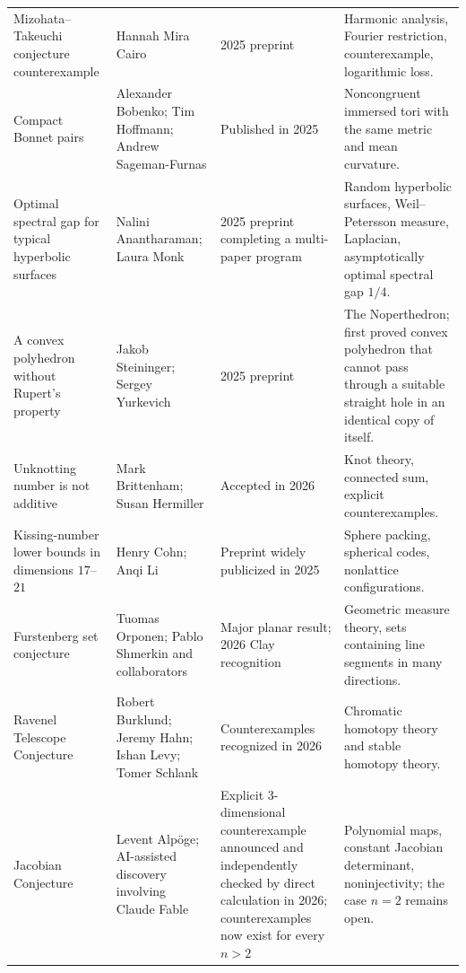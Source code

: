 {\begin{longtable}{@{}L{0.25\textwidth}L{0.22\textwidth}L{0.18\textwidth}L{0.27\textwidth}@{}}
        Mizohata--Takeuchi conjecture counterexample
        & Hannah Mira Cairo
        & 2025 preprint
        & Harmonic analysis, Fourier restriction, counterexample, logarithmic loss. \\

        Compact Bonnet pairs
        & Alexander Bobenko; Tim Hoffmann; Andrew Sageman-Furnas
        & Published in 2025
        & Noncongruent immersed tori with the same metric and mean curvature. \\

        Optimal spectral gap for typical hyperbolic surfaces
        & Nalini Anantharaman; Laura Monk
        & 2025 preprint completing a multi-paper program
        & Random hyperbolic surfaces, Weil--Petersson measure, Laplacian,
          asymptotically optimal spectral gap $1/4$. \\

        A convex polyhedron without Rupert's property
        & Jakob Steininger; Sergey Yurkevich
        & 2025 preprint
        & The Noperthedron; first proved convex polyhedron that cannot pass
          through a suitable straight hole in an identical copy of itself. \\

        Unknotting number is not additive
        & Mark Brittenham; Susan Hermiller
        & Accepted in 2026
        & Knot theory, connected sum, explicit counterexamples. \\

        Kissing-number lower bounds in dimensions $17$--$21$
        & Henry Cohn; Anqi Li
        & Preprint widely publicized in 2025
        & Sphere packing, spherical codes, nonlattice configurations. \\

        Furstenberg set conjecture
        & Tuomas Orponen; Pablo Shmerkin and collaborators
        & Major planar result; 2026 Clay recognition
        & Geometric measure theory, sets containing line segments in many directions. \\

        Ravenel Telescope Conjecture
        & Robert Burklund; Jeremy Hahn; Ishan Levy; Tomer Schlank
        & Counterexamples recognized in 2026
        & Chromatic homotopy theory and stable homotopy theory. \\

        Jacobian Conjecture
        & Levent Alpöge; AI-assisted discovery involving Claude Fable
        & Explicit $3$-dimensional counterexample announced and independently
          checked by direct calculation in 2026; counterexamples now exist for every $n>2$
        & Polynomial maps, constant Jacobian determinant, noninjectivity; the
          case $n=2$ remains open. \\


\end{longtable}}
